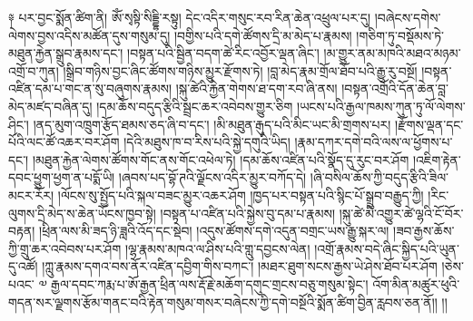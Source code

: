 \documentclass{article}
\begin{document}
༈ པར་བྱང་སྨོན་ཚིག་ནི། ཨོཾ་སྭསྟི་སིདྡྷི་རསྟུ། དེང་འདིར་གསུང་རབ་རིན་ཆེན་འཕྲུལ་པར་དུ། །བཞེངས་དགེས་ལེགས་བྱས་འདིས་མཚོན་དུས་གསུམ་དུ། །བགྱིས་པའི་དགེ་ཚོགས་དྲི་མ་མེད་པ་རྣམས། །གཅིག་ཏུ་བསྡོམས་ཏེ་མཐུན་རྐྱེན་སྒྲུབ་རྣམས་དང་། །བསྟན་པའི་སྦྱིན་བདག་ཚེ་རིང་འབྱོར་ལྡན་ཞིང་། །མ་གྱུར་ནམ་མཁའི་མཐའ་མཉམ་འགྲོ་བ་ཀུན། །སྒྲིབ་གཉིས་བྱང་ཞིང་ཚོགས་གཉིས་མྱུར་རྫོགས་ཏེ། །བླ་མེད་རྣམ་གྲོལ་ཐོབ་པའི་རྒྱུ་རུ་བསྔོ། །བསྟན་འཛིན་དམ་པ་གང་ན་སུ་བཞུགས་རྣམས། །སྐུ་ཚེའི་རྐྱེན་གེགས་ཐ་དག་རབ་ཞི་ནས། །བསྟན་འགྲོའི་དོན་ཆེན་བླ་མེད་མཛད་བཞིན་དུ། །དམ་ཆོས་བདུད་རྩིའི་སྦྲང་ཆར་འབེབས་གྱུར་ཅིག །ཡངས་པའི་རྒྱལ་ཁམས་ཀུན་ཏུ་ལོ་ལེགས་ཤིང་། །ནད་མུག་འཁྲུག་རྩོད་ཐམས་ཅད་ཞི་བ་དང་། །མི་མཐུན་རྒུད་པའི་མིང་ཡང་མི་གྲགས་པར། །རྫོགས་ལྡན་དང་པོའི་ལང་ཚོ་འཆར་བར་ཤོག །དེའི་མཐུས་ཁ་བ་རིས་པའི་སྐྱེ་དགུའི་ཡིད། །རྣམ་དཀར་དགེ་བའི་ལས་ལ་ཕྱོགས་པ་དང་། །མཐུན་རྐྱེན་ལེགས་ཚོགས་གོང་ནས་གོང་འཕེལ་ཏེ། །དམ་ཆོས་འཛིན་པའི་སྣོད་དུ་རུང་བར་ཤོག །འཇིག་རྟེན་དབང་ཕྱུག་ཕྱག་ན་པདྨོ་ཡི། །ཞབས་པད་བྷོ་ཊའི་ལྗོངས་འདིར་མྱུར་བཀོད་དེ། །ཞི་བསིལ་ཆོས་ཀྱི་བདུད་རྩིའི་ཟིལ་མངར་རོར། །ལོངས་སུ་སྤྱོད་པའི་སྐལ་བཟང་མྱུར་འཆར་ཤོག །ཁྱད་པར་བསྟན་པའི་སྙིང་པོ་སྒྲུབ་བརྒྱུད་ཀྱི། །རིང་ལུགས་དྲི་མེད་ས་ཆེན་ཡོངས་ཁྱབ་སྟེ། །བསྟན་པ་འཛིན་པའི་སྐྱེས་བུ་དམ་པ་རྣམས། །སྐུ་ཚེ་མི་འགྱུར་ཚེ་ལྷའི་ངོ་བོར་བརྟན། །ཕྲིན་ལས་མི་ཟད་ཉི་ཟླའི་འོད་དང་སྡེབ། །འདུས་ཚོགས་དགེ་འདུན་བགྲང་ཡས་རྒྱུ་སྐར་ལ། །ཟབ་རྒྱས་ཆོས་ཀྱི་གྲུ་ཆར་འབེབས་པར་ཤོག །ལྷ་རྣམས་མཁའ་ལ་ཤིས་པའི་གླུ་དབྱངས་ལེན། །འགྲོ་རྣམས་བདེ་ཞིང་སྐྱིད་པའི་ཡུན་དུ་འཚོ། །ཀླུ་རྣམས་དགའ་བས་ནོར་འཛིན་དབྱིག་གིས་བཀང་། །མཐར་ཐུག་སངས་རྒྱས་ཡེ་ཤེས་ཐོབ་པར་ཤོག །ཅེས་པའང་ ༧ རྒྱལ་དབང་ཀརྨ་པ་ཨོ་རྒྱན་ཕྲིན་ལས་རྡོ་རྗེ་མཆོག་དགུང་གྲངས་བཅུ་གསུམ་སྟེང་། འོག་མིན་མཚུར་ཕུའི་གདན་སར་ལྗགས་རྩོམ་གནང་བའི་རྟེན་གསུམ་གསར་བཞེངས་ཀྱི་དགེ་བསྔོའི་སྨོན་ཚིག་བྱིན་རླབས་ཅན་ནོ།། །།
\end{document}
